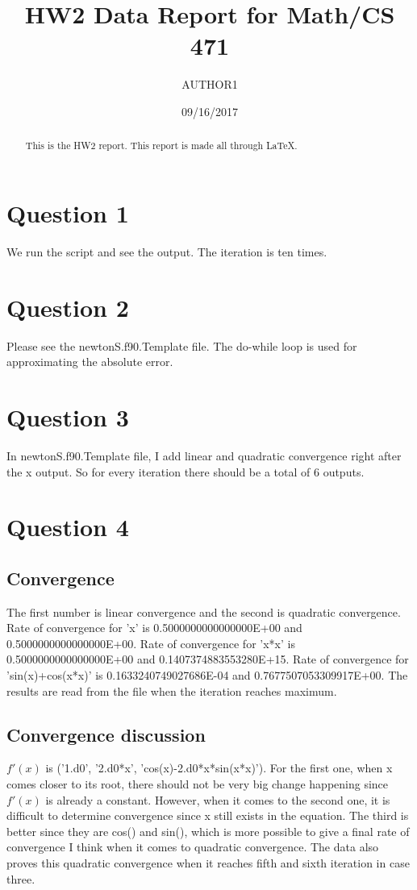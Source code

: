 \documentclass[titlepage]{article}
\title{HW2 Data Report for Math/CS 471}
\author{AUTHOR1}
\date{09/16/2017}   %
\begin{document}
\maketitle

\begin{abstract}
This is the HW2 report. This report is made all through LaTeX.
\end{abstract}

\section{Question 1}
We run the script and see the output. The iteration is ten times.

\section{Question 2}
Please see the newtonS.f90.Template file. The do-while loop is used
for approximating the absolute error.

\section{Question 3}
In newtonS.f90.Template file, I add linear and quadratic convergence
right after the x output. So for every iteration there should be a
total of 6 outputs.

\section{Question 4}
\subsection{Convergence}
The first number is linear convergence and the second is quadratic
convergence.  
Rate of convergence for 'x' is 0.5000000000000000E+00 and
0.5000000000000000E+00.
Rate of convergence for 'x*x' is 0.5000000000000000E+00 and 
0.1407374883553280E+15. 
Rate of convergence for 'sin(x)+cos(x*x)' is 0.1633240749027686E-04 and
0.7677507053309917E+00.
The results are read from the file when the iteration reaches maximum.

\subsection{Convergence discussion}
$f'(x)$ is ('1.d0', '2.d0*x', 'cos(x)-2.d0*x*sin(x*x)'). 
For the first one, when x comes closer to its root, there should not
be very big change happening since $f'(x)$ is already a
constant. However, when it comes to the second one, it is difficult to
determine convergence since x still exists in the equation. The third
is better since they are cos() and sin(), which is more possible to give a
final rate of convergence I think when it comes to quadratic
convergence. The data also proves this quadratic convergence when it
reaches fifth and sixth iteration in case three.
\end{document}
